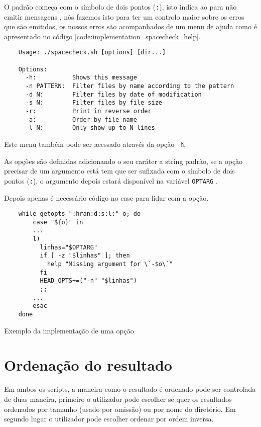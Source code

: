 O padrão começa com o símbolo de dois pontos (\Verb|:|), isto indica ao
 para não emitir mensagens \cite[2837]{posix}, nós fazemos
isto para ter um controlo maior sobre os erros que são emitidos, os nossos erros
são acompanhados de um menu de ajuda como é apresentado no código
\ref{code:implementation_spacecheck_help}.

\begin{listing}[H]
	\centering
	\begin{verbatim}
    Usage: ./spacecheck.sh [options] [dir...]

    Options:
      -h:          Shows this message
      -n PATTERN:  Filter files by name according to the pattern
      -d N:        Filter files by date of modification
      -s N:        Filter files by file size
      -r:          Print in reverse order
      -a:          Order by file name
      -l N:        Only show up to N lines
  \end{verbatim}
	\cprotect\caption{Menu de ajuda do \Verb|spacecheck.sh|}
	\label{code:implementation_spacecheck_help}
\end{listing}

Este menu também pode ser acessado através da opção \Verb|-h|.

As opções são definidas adicionando o seu caráter a string padrão, se a opção
precisar de um argumento está tem que ser sufixada com o símbolo de dois pontos
(\Verb|:|), o argumento depois estará disponível na variável \Verb|OPTARG|
\cite[2838]{posix}.

Depois apenas é necessário código no case para lidar com a opção.

\begin{listing}[H]
	\centering
	\begin{verbatim}
    while getopts ":hran:d:s:l:" o; do
        case "${o}" in
        ...
        l)
          linhas="$OPTARG"
          if [ -z "$linhas" ]; then
            help "Missing argument for \`-$o\`"
          fi
          HEAD_OPTS+=("-n" "$linhas")
          ;;
        ...
        esac
    done
  \end{verbatim}
	\caption{Exemplo da implementação de uma opção}
\end{listing}

\section{Ordenação do resultado}

Em ambos os scripts, a maneira como o resultado é ordenado pode ser controlada
de duas maneira, primeiro o utilizador pode escolher se quer os resultados
ordenados por tamanho (usado por omissão) ou por nome do diretório. Em segundo
lugar o utilizador pode escolher ordenar por ordem inversa.

